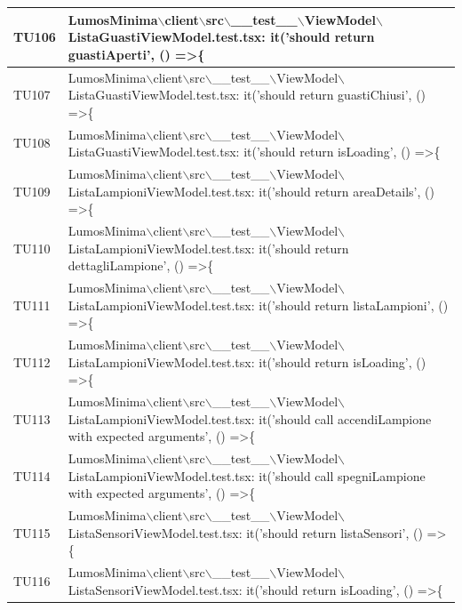 \documentclass[12pt]{article}
\begin{document}
\begin{scriptsize}
\begin{xltabular}{\linewidth}{|>{\hsize}X|X|}
	TU106 & LumosMinima$\backslash$client$\backslash$src$\backslash$\_\_test\_\_$\backslash$ViewModel$\backslash$ListaGuastiViewModel.test.tsx: it('should return guastiAperti', () =\textgreater \{ \\ \hline
	TU107 & LumosMinima$\backslash$client$\backslash$src$\backslash$\_\_test\_\_$\backslash$ViewModel$\backslash$ListaGuastiViewModel.test.tsx: it('should return guastiChiusi', () =\textgreater \{ \\ \hline
	TU108 & LumosMinima$\backslash$client$\backslash$src$\backslash$\_\_test\_\_$\backslash$ViewModel$\backslash$ListaGuastiViewModel.test.tsx: it('should return isLoading', () =\textgreater \{ \\ \hline
	TU109 & LumosMinima$\backslash$client$\backslash$src$\backslash$\_\_test\_\_$\backslash$ViewModel$\backslash$ListaLampioniViewModel.test.tsx: it('should return areaDetails', () =\textgreater \{ \\ \hline
	TU110 & LumosMinima$\backslash$client$\backslash$src$\backslash$\_\_test\_\_$\backslash$ViewModel$\backslash$ListaLampioniViewModel.test.tsx: it('should return dettagliLampione', () =\textgreater \{ \\ \hline
	TU111 & LumosMinima$\backslash$client$\backslash$src$\backslash$\_\_test\_\_$\backslash$ViewModel$\backslash$ListaLampioniViewModel.test.tsx: it('should return listaLampioni', () =\textgreater \{ \\ \hline
	TU112 & LumosMinima$\backslash$client$\backslash$src$\backslash$\_\_test\_\_$\backslash$ViewModel$\backslash$ListaLampioniViewModel.test.tsx: it('should return isLoading', () =\textgreater \{ \\ \hline
	TU113 & LumosMinima$\backslash$client$\backslash$src$\backslash$\_\_test\_\_$\backslash$ViewModel$\backslash$ListaLampioniViewModel.test.tsx: it('should call accendiLampione with expected arguments', () =\textgreater \{ \\ \hline
	TU114 & LumosMinima$\backslash$client$\backslash$src$\backslash$\_\_test\_\_$\backslash$ViewModel$\backslash$ListaLampioniViewModel.test.tsx: it('should call spegniLampione with expected arguments', () =\textgreater \{ \\ \hline
	TU115 & LumosMinima$\backslash$client$\backslash$src$\backslash$\_\_test\_\_$\backslash$ViewModel$\backslash$ListaSensoriViewModel.test.tsx: it('should return listaSensori', () =\textgreater \{ \\ \hline
	TU116 & LumosMinima$\backslash$client$\backslash$src$\backslash$\_\_test\_\_$\backslash$ViewModel$\backslash$ListaSensoriViewModel.test.tsx: it('should return isLoading', () =\textgreater \{ \\ \hline

\end{xltabular}
\end{scriptsize}
\end{document}
